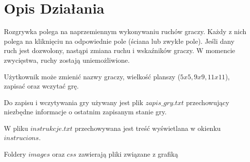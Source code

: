 \documentclass{article}
\newcommand{\akapit}{\hspace{0.5cm}}
\begin{document}
		\section*{Opis Działania}
		\akapit Rozgrywka polega na naprzemiennym wykonywaniu ruchów graczy. Każdy z nich polega na kliknięciu na odpowiednie pole (ściana lub zwykłe pole). Jeśli dany ruch jest dozwolony, nastąpi zmiana ruchu i wskaźników graczy. W momencie zwycięstwa, ruchy zostają uniemożliwione. 
		\par Użytkownik może zmienić nazwy graczy, wielkość planszy ($5x5, 9x9, 11x11$), zapisać oraz wczytać grę. 
		\par Do zapisu i wczytywania gry używany jest plik $zapis\_gry.txt$ przechowujący niezbędne informacje o ostatnim zapisanym stanie gry.
		\par W pliku $instrukcje.txt$ przechowywana jest treść wyświetlana w okienku $instrucions$. 
		\par Foldery $images$ oraz $css$ zawierają pliki związane z grafiką
		
		
\end{document}
